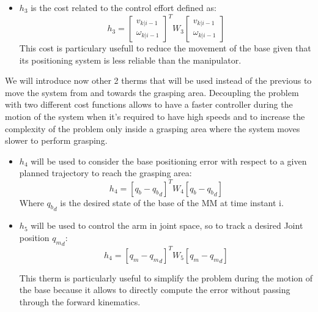 \begin{itemize}
\item $h_3$ is the cost related to the control effort defined as: 
	\begin{equation}
	        h_3=\left[ \begin{matrix} v_{k|i-1} \\ \omega_{k|i-1} \end{matrix}\right]^T W_3 \left[ \begin{matrix} v_{k|i-1} \\ \omega_{k|i-1} \end{matrix}\right]
	 \end{equation}
This cost is particulary usefull to reduce the movement of the base given that its positioning system is less reliable than the manipulator.
\end{itemize}
We will introduce now other 2 therms that will be used instead of the previous to move the system from and towards the grasping area. Decoupling the problem with two different cost functions allows to have a faster controller during the motion of the system when it's required to have high speeds and to increase the complexity of the problem only inside a grasping area where the system moves slower to perform grasping. 
\begin{itemize}
    \item $h_4$ will be used to consider the base positioning error with respect to a given planned trajectory to reach the grasping area:
        \begin{equation}
            h_4=[q_b-{q_b}_d]^T W_4 [q_b-{q_b}_d]
        \end{equation}
        Where ${q_b}_d$ is the desired state of the base of the MM at time instant i. \\
    \item $h_5$ will be used to control the arm in joint space, so to track a desired Joint position ${q_m}_d$:
    \begin{equation}
       h_4=[q_m-{q_m}_d]^T W_5 [q_m-{q_m}_d]
    \end{equation}
     
    This therm is particularly useful to simplify the problem during the motion of the base because it allows to directly compute the error without passing through the forward kinematics.
\end{itemize}



